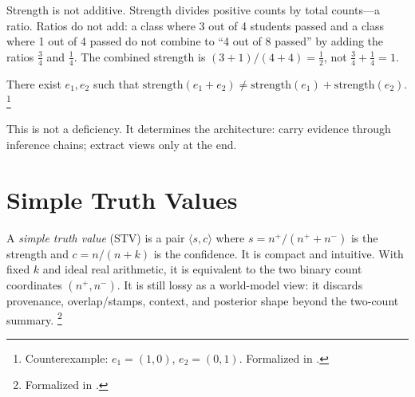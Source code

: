 \documentclass[11pt,openany]{report}
\begin{document}
Strength is not additive.  Strength divides positive counts by
total counts---a ratio.  Ratios do not add: a class where 3 out of 4
students passed and a class where 1 out of 4 passed do not combine
to ``4 out of 8 passed'' by adding the ratios $\tfrac{3}{4}$ and
$\tfrac{1}{4}$.  The combined strength is $(3+1)/(4+4) = \tfrac{1}{2}$,
not $\tfrac{3}{4} + \tfrac{1}{4} = 1$.

\begin{theorem}
There exist $e_1, e_2$ such that
$\mathrm{strength}(e_1 + e_2) \ne
\mathrm{strength}(e_1) + \mathrm{strength}(e_2)$.%
\footnote{Counterexample: $e_1 = (1, 0)$, $e_2 = (0, 1)$.
Formalized in .}
\end{theorem}

\noindent
This is not a deficiency.  It determines the architecture: carry
evidence through inference chains; extract views only at the end.


\section{Simple Truth Values}

A \emph{simple truth value} (STV) is a pair $\langle s, c \rangle$
where $s = n^+ / (n^+ + n^-)$ is the strength and
$c = n / (n + k)$ is the confidence.  It is compact and intuitive.
With fixed $k$ and ideal real arithmetic, it is equivalent to the two
binary count coordinates $(n^+,n^-)$.  It is still lossy as a
world-model view: it discards provenance, overlap/stamps, context, and
posterior shape beyond the two-count summary.%
\footnote{Formalized in
.}

\end{document}
